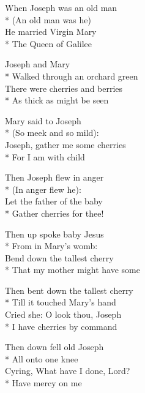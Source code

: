 

\versemark
When Joseph was an old man\\*
(An old man was he)\\
He married Virgin Mary\\*
The Queen of Galilee\etc

\versemark
Joseph and Mary\\*
Walked through an orchard green\\
There were cherries and berries\\*
As thick as might be seen\etc

\versemark
Mary said to Joseph\\*
(So meek and so mild):\\
Joseph, gather me some cherries\\*
For I am with child\etc

\versemark
Then Joseph flew in anger\\*
(In anger flew he):\\
Let the father of the baby\\*
Gather cherries for thee!\etc

\versemark
Then up spoke baby Jesus\\*
From in Mary’s womb:\\
Bend down the tallest cherry\\*
That my mother might have some\etc

\versemark
Then bent down the tallest cherry\\*
Till it touched Mary’s hand\\
Cried she: O look thou, Joseph\\*
I have cherries by command\etc

\versemark
Then down fell old Joseph\\*
All onto one knee\\
Cyring, What have I done, Lord?\\*
Have mercy on me\etc\repeatfirst

